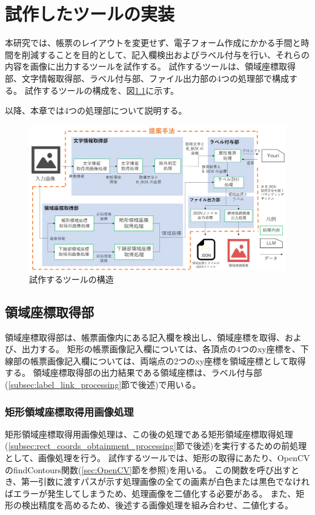 \chapter{試作したツールの実装}\label{cha:Implementation}
本研究では、帳票のレイアウトを変更せず、電子フォーム作成にかかる手間と時間を削減することを目的として、記入欄検出およびラベル付与を行い、それらの内容を画像に出力するツールを試作する。
試作するツールは、領域座標取得部、文字情報取得部、ラベル付与部、ファイル出力部の4つの処理部で構成する。
試作するツールの構成を、図\ref{fig:structure}に示す。

以降、本章では4つの処理部について説明する。

\begin{figure}[t]
    \begin{center}
        \includegraphics[width=15cm]{image/04-implementation/structure.png}
        \caption{試作するツールの構造}
        \label{fig:structure}
    \end{center}
\end{figure}


\section{領域座標取得部}\label{sec:area_coords_obtainment_part}
領域座標取得部は、帳票画像内にある記入欄を検出し、領域座標を取得、および、出力する。
矩形の帳票画像記入欄については、各頂点の4つのxy座標を、下線部の帳票画像記入欄については、両端点の2つのxy座標を領域座標として取得する。
領域座標取得部の出力結果である領域座標は、ラベル付与部(\ref{subsec:label_link_processing}節で後述)で用いる。

\subsection{矩形領域座標取得用画像処理}\label{subsec:image_processing_for_rect_coords_obtainment}
矩形領域座標取得用画像処理は、この後の処理である矩形領域座標取得処理(\ref{subsec:rect_coords_obtainment_processing}節で後述)を実行するための前処理として、画像処理を行う。
試作するツールでは、矩形の取得にあたり、OpenCVのfindContours関数(\ref{sec:OpenCV}節を参照)を用いる。
この関数を呼び出すとき、第一引数に渡すパスが示す処理画像の全ての画素が白色または黒色でなければエラーが発生してしまうため、処理画像を二値化する必要がある。
また、矩形の検出精度を高めるため、後述する画像処理を組み合わせ、二値化する。

